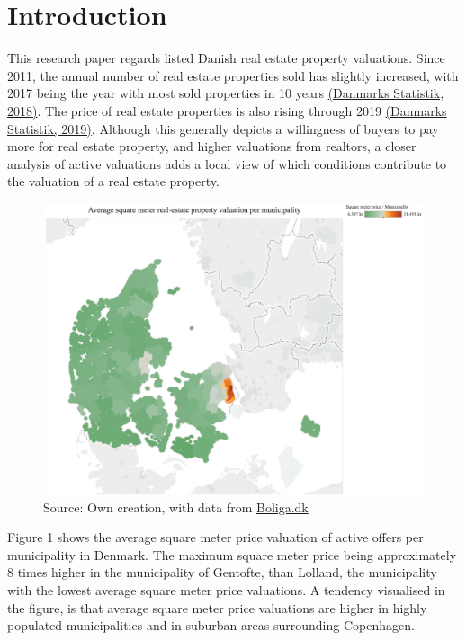 \documentclass[12pt,a4paper]{article}
\begin{document}

\newpage
\onehalfspacing

\tableofcontents
\newpage
\section{Introduction}
This research paper regards listed Danish real estate property valuations. Since 2011, the annual number of real estate properties sold has slightly increased, with 2017 being the year with most sold properties in 10 years \href{https://www.dst.dk/da/Statistik/nyt/NytHtml?cid=27979}{(Danmarks Statistik, 2018)}. The price of real estate properties is also rising through 2019 \href{https://www.dst.dk/da/Statistik/nyt/NytHtml?cid=28741}{(Danmarks Statistik, 2019)}. Although this generally depicts a willingness of buyers to pay more for real estate property, and higher valuations from realtors, a closer analysis of active valuations adds a local view of which conditions contribute to the valuation of a real estate property. \newline
\newcommand{\source}[1]{\caption*{Source: {#1}} }\begin{figure}[H]
\centering
\caption{}
\includegraphics[scale=0.4]{123.png}
\source{Own creation, with data from \href{https://www.boliga.dk}{Boliga.dk}}
\end{figure}

Figure 1 shows the average square meter price valuation of active offers per municipality in Denmark. The maximum square meter price being approximately 8 times higher in the municipality of Gentofte, than Lolland, the municipality with the lowest average square meter price valuations. A tendency visualised in the figure, is that average square meter price valuations are higher in highly populated municipalities and in suburban areas surrounding Copenhagen. \newline
\end{document}
